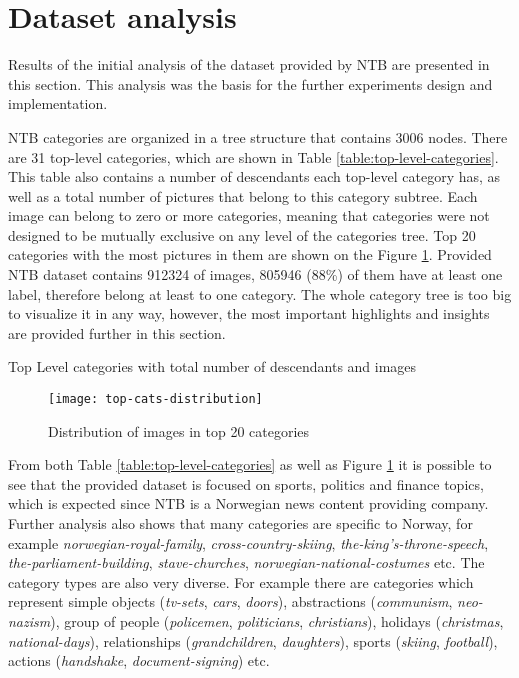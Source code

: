 \section{Dataset analysis}
Results of the initial analysis of the dataset provided by NTB are presented in this section. This analysis was the basis for the further experiments design and implementation.

NTB categories are organized in a tree structure that contains 3006 nodes. There are 31 top-level categories, which are shown in Table \ref{table:top-level-categories}. This table also contains a number of descendants each top-level category has, as well as a total number of pictures that belong to this category subtree.  Each image can belong to zero or more categories, meaning that categories were not designed to be mutually exclusive on any level of the categories tree. Top 20 categories with the most pictures in them are shown on the Figure \ref{fig:top-cats-distribution}. Provided NTB dataset contains 912324 of images, 805946 (88\%) of them have at least one label, therefore belong at least to one category. The whole category tree is too big to visualize it in any way, however, the most important highlights and insights are provided further in this section.

\begin{table}[h!]
    \centering
    \caption{Top Level categories with total number of descendants and images}
    \label{table:top-level-categories}
\end{table}

\begin{figure}[h!]
    \centering
    \texttt{[image: top-cats-distribution]}
    \caption{Distribution of images in top 20 categories}
    \label{fig:top-cats-distribution}
\end{figure}

From both Table \ref{table:top-level-categories} as well as Figure \ref{fig:top-cats-distribution} it is possible to see that the provided dataset is focused on sports, politics and finance topics, which is expected since NTB is a Norwegian news content providing company. Further analysis also shows that many categories are specific to Norway, for example \textit{norwegian-royal-family}, \textit{cross-country-skiing}, \textit{the-king's-throne-speech}, \textit{the-parliament-building}, \textit{stave-churches}, \textit{norwegian-national-costumes} etc. The category types are also very diverse. For example there are categories which represent simple objects (\textit{tv-sets}, \textit{cars}, \textit{doors}), abstractions (\textit{communism}, \textit{neo-nazism}), group of people (\textit{policemen}, \textit{politicians}, \textit{christians}), holidays (\textit{christmas}, \textit{national-days}), relationships (\textit{grandchildren}, \textit{daughters}), sports (\textit{skiing}, \textit{football}), actions (\textit{handshake}, \textit{document-signing}) etc.

